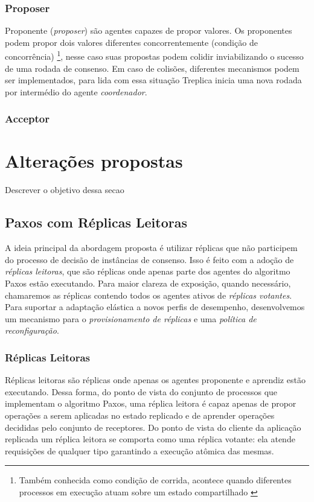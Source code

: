 \subsubsection{Proposer}

Proponente (\emph{proposer}) são agentes capazes de propor valores. Os proponentes podem
propor dois valores diferentes concorrentemente (condição de concorrência)
\footnote{Também conhecida como condição de corrida, acontece quando diferentes processos
em execução atuam sobre um estado compartilhado \cite{alguem}}, nesse caso suas propostas
podem colidir inviabilizando o sucesso de uma rodada de consenso. Em caso de colisões,
diferentes mecanismos podem ser implementados, para lida com essa situação Treplica inicia
uma nova rodada por intermédio do agente \emph{coordenador}.

\subsubsection{Acceptor}


\section{Alterações propostas}

Descrever o objetivo dessa secao

\subsection{Paxos com Réplicas Leitoras}

A ideia principal da abordagem proposta é utilizar réplicas que não participem do processo
de decisão de instâncias de consenso. Isso é feito com a adoção de \emph{réplicas
leitoras}, que são réplicas onde apenas parte dos agentes do algoritmo Paxos estão
executando. Para maior clareza de exposição, quando necessário, chamaremos as réplicas
contendo todos os agentes ativos de \emph{réplicas votantes}. Para suportar a adaptação
elástica a novos perfis de desempenho, desenvolvemos um mecanismo para o
\emph{provisionamento de réplicas} e uma \emph{política de reconfiguração}.

\subsubsection{Réplicas Leitoras}

Réplicas leitoras são réplicas onde apenas os agentes proponente e aprendiz estão
executando. Dessa forma, do ponto de vista do conjunto de processos que implementam o
algoritmo Paxos, uma réplica leitora é capaz apenas de propor operações a serem aplicadas
no estado replicado e de aprender operações decididas pelo conjunto de receptores. Do
ponto de vista do cliente da aplicação replicada um réplica leitora se comporta como uma
réplica votante: ela atende requisições de qualquer tipo garantindo a execução atômica das
mesmas.

